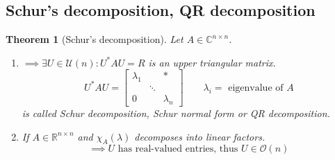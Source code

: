 \documentclass{article}
\newtheorem{theorem}{Theorem}  \numberwithin{theorem}{section}
\begin{document}
\subsection{Schur's decomposition, QR decomposition}

\begin{theorem}[Schur's decomposition] %
  Let $A \in \mathbb C^{n \times n}$.
  \begin{enumerate}
    \item $\implies \exists U \in \mathcal U(n): U^* AU = R$ is an upper triangular matrix.
      \[ U^* AU = \begin{bmatrix} \lambda_1 & & * \\ & \ddots & \\ 0 & & \lambda_n \end{bmatrix} \qquad \lambda_i = \text{ eigenvalue of } A \]
      is called \emph{Schur decomposition}, \emph{Schur normal form} or \emph{QR decomposition}.
    \item If $A \in \mathbb R^{n \times n}$ and $\chi_A(\lambda)$ decomposes into linear factors.
      \[ \implies U \text{ has real-valued entries, thus } U \in \mathcal O(n) \]
  \end{enumerate}
\end{theorem}
\end{document}
